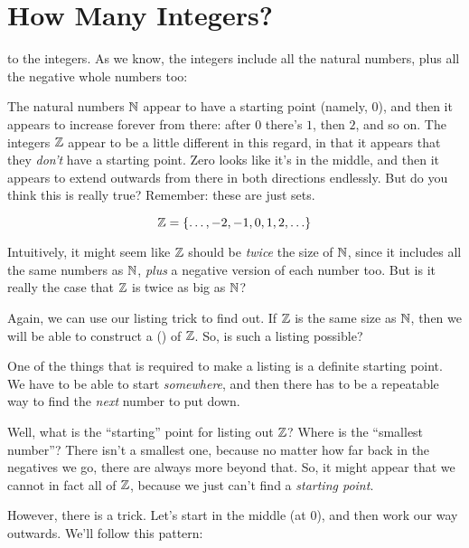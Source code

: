 \documentclass[../../../main.tex]{subfiles}
\begin{document}
\section{How Many Integers?}

 to the integers. As we know, the integers include all the natural numbers, plus all the negative whole numbers too:

\begin{ponder}
  The natural numbers $\Nats/$ appear to have a starting point (namely, $0$), and then it appears to increase forever from there: after $0$ there's $1$, then $2$, and so on. The integers $\Ints/$ appear to be a little different in this regard, in that it appears that they \emph{don't} have a starting point. Zero looks like it's in the middle, and then it appears to extend outwards from there in both directions endlessly. But do you think this is really true? Remember: these are just sets.
\end{ponder}

\begin{equation*} 
  \Ints/ = \{ \ldots, -2, -1, 0, 1, 2, \ldots \}
\end{equation*}

Intuitively, it might seem like $\Ints/$ should be \emph{twice} the size of $\Nats/$, since it includes all the same numbers as $\Nats/$, \emph{plus} a negative version of each number too. But is it really the case that $\Ints/$ is twice as big as $\Nats/$?

Again, we can use our listing trick to find out. If $\Ints/$ is the same size as $\Nats/$, then we will be able to construct a  () of $\Ints/$. So, is such a listing possible?

One of the things that is required to make a listing is a definite starting point. We have to be able to start \emph{somewhere}, and then there has to be a repeatable way to find the \emph{next} number to put down. 

Well, what is the ``starting'' point for listing out $\Ints/$? Where is the ``smallest number''? There isn't a smallest one, because no matter how far back in the negatives we go, there are always more beyond that. So, it might appear that we cannot in fact  all of $\Ints/$, because we just can't find a \emph{starting point}. 

However, there is a trick. Let's start in the middle (at $0$), and then work our way outwards. We'll follow this pattern:
\end{document}
